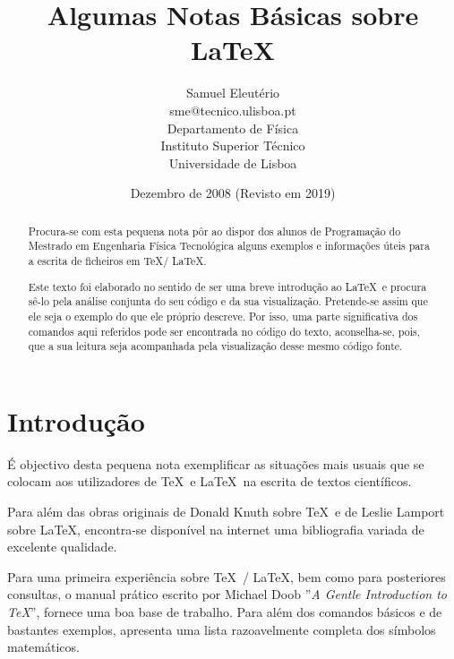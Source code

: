 \documentclass[a4paper,12pt]{article}
\begin{document}
\title{\bf Algumas Notas Básicas sobre \LaTeX}
\author{Samuel Eleutério \\ 
{\small sme@tecnico.ulisboa.pt} \\ 
Departamento de Física \\ 
Instituto Superior Técnico \\
Universidade de Lisboa}
\date{Dezembro de 2008 (Revisto em 2019)}

\maketitle

\begin{abstract}
Procura-se com esta pequena nota pôr ao dispor dos
alunos de Programação do Mestrado em Engenharia Física Tecnológica
alguns exemplos e informações úteis para a escrita de ficheiros
em \TeX / \LaTeX.
\par
Este texto foi elaborado no sentido de ser uma breve introdução 
ao \LaTeX\ e procura sê-lo pela análise conjunta do seu código e
da sua visualização.\,\,Pretende-se assim que ele seja o exemplo do 
que ele próprio descreve. Por isso, uma parte significativa dos comandos aqui 
referidos pode ser encontrada no código do texto, 
aconselha-se, pois, que a sua leitura seja acompanhada pela visualização 
desse mesmo código fonte.
\end{abstract}

\pagebreak

\tableofcontents

\pagebreak

\section*{Introdução}

É objectivo desta pequena nota exemplificar as situações mais usuais
que se colocam aos utilizadores de \TeX\ e \LaTeX\ na escrita de textos 
científicos.

Para além das obras originais de Donald Knuth\cite{Knuth:1984}
sobre \TeX\ e de Leslie Lamport\cite{Lamport:1986} sobre \LaTeX, encontra-se
disponível na internet uma bibliografia variada de 
excelente qualidade.

Para uma primeira experiência sobre \TeX\ / \LaTeX, bem como 
para posteriores consultas, o 
manual prático escrito por Michael Doob\cite{Doob}
''{\it A Gentle Introduction to \TeX}'', fornece uma boa
base de trabalho. Para além dos comandos básicos e de bastantes
exemplos, apresenta
uma lista razoavelmente completa dos símbolos matemáticos.
\end{document}
